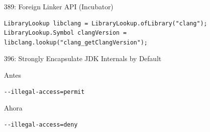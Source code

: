 \documentclass[aspectratio=169]{beamer}
\begin{document}
\begin{frame}[fragile]{389: Foreign Linker API (Incubator)}


\begin{lstlisting}
LibraryLookup libclang = LibraryLookup.ofLibrary("clang");
LibraryLookup.Symbol clangVersion = libclang.lookup("clang_getClangVersion");
\end{lstlisting}

\end{frame}


\begin{frame}[fragile]{396: Strongly Encapsulate JDK Internals by Default}

Antes
\begin{lstlisting}
--illegal-access=permit 
\end{lstlisting}	

Ahora
\begin{lstlisting}
--illegal-access=deny 
\end{lstlisting}

\end{frame}
\end{document}

